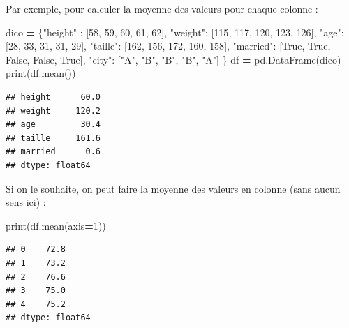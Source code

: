 \documentclass[12pt,]{book}
\newenvironment{Shaded}{\begin{snugshade}}{\end{snugshade}}
\newcommand{\DecValTok}[1]{\textcolor[rgb]{0.00,0.00,0.81}{#1}}
\newcommand{\StringTok}[1]{\textcolor[rgb]{0.31,0.60,0.02}{#1}}
\newcommand{\VariableTok}[1]{\textcolor[rgb]{0.00,0.00,0.00}{#1}}
\newcommand{\OperatorTok}[1]{\textcolor[rgb]{0.81,0.36,0.00}{\textbf{#1}}}
\newcommand{\BuiltInTok}[1]{#1}
\newcommand{\NormalTok}[1]{#1}
\numberwithin{equation}{section}
\numberwithin{countremarque}{section}
\begin{document}
Par exemple, pour calculer la moyenne des valeurs pour chaque colonne :

\begin{Shaded}
\begin{Highlighting}[]
\NormalTok{dico }\OperatorTok{=}\NormalTok{ \{}\StringTok{"height"}\NormalTok{ : [}\DecValTok{58}\NormalTok{, }\DecValTok{59}\NormalTok{, }\DecValTok{60}\NormalTok{, }\DecValTok{61}\NormalTok{, }\DecValTok{62}\NormalTok{],}
        \StringTok{"weight"}\NormalTok{: [}\DecValTok{115}\NormalTok{, }\DecValTok{117}\NormalTok{, }\DecValTok{120}\NormalTok{, }\DecValTok{123}\NormalTok{, }\DecValTok{126}\NormalTok{],}
        \StringTok{"age"}\NormalTok{: [}\DecValTok{28}\NormalTok{, }\DecValTok{33}\NormalTok{, }\DecValTok{31}\NormalTok{, }\DecValTok{31}\NormalTok{, }\DecValTok{29}\NormalTok{],}
        \StringTok{"taille"}\NormalTok{: [}\DecValTok{162}\NormalTok{, }\DecValTok{156}\NormalTok{, }\DecValTok{172}\NormalTok{, }\DecValTok{160}\NormalTok{, }\DecValTok{158}\NormalTok{],}
        \StringTok{"married"}\NormalTok{: [}\VariableTok{True}\NormalTok{, }\VariableTok{True}\NormalTok{, }\VariableTok{False}\NormalTok{, }\VariableTok{False}\NormalTok{, }\VariableTok{True}\NormalTok{],}
        \StringTok{"city"}\NormalTok{: [}\StringTok{"A"}\NormalTok{, }\StringTok{"B"}\NormalTok{, }\StringTok{"B"}\NormalTok{, }\StringTok{"B"}\NormalTok{, }\StringTok{"A"}\NormalTok{]}
\NormalTok{       \} }
\NormalTok{df }\OperatorTok{=}\NormalTok{ pd.DataFrame(dico)}
\BuiltInTok{print}\NormalTok{(df.mean())}
\end{Highlighting}
\end{Shaded}

\begin{lstlisting}
## height      60.0
## weight     120.2
## age         30.4
## taille     161.6
## married      0.6
## dtype: float64
\end{lstlisting}

Si on le souhaite, on peut faire la moyenne des valeurs en colonne (sans
aucun sens ici) :

\begin{Shaded}
\begin{Highlighting}[]
\BuiltInTok{print}\NormalTok{(df.mean(axis}\OperatorTok{=}\DecValTok{1}\NormalTok{))}
\end{Highlighting}
\end{Shaded}

\begin{lstlisting}
## 0    72.8
## 1    73.2
## 2    76.6
## 3    75.0
## 4    75.2
## dtype: float64
\end{lstlisting}
\end{document}
